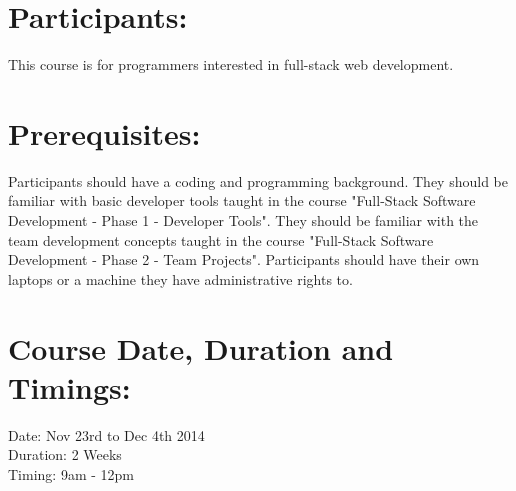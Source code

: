 \documentclass[a4paper,11pt]{article}
\begin{document}
\section{Participants:}
This course is for programmers interested in full-stack web development. 

\section{Prerequisites:}
Participants should have a coding and programming background. They should be familiar with basic developer tools taught in the course "Full-Stack Software Development - Phase 1 - Developer Tools". They should be familiar with the team development concepts taught in the course "Full-Stack Software Development - Phase 2 - Team Projects". Participants should have their own laptops or a machine they have administrative rights to.

\section{Course Date, Duration and Timings:}
Date: Nov 23rd to Dec 4th 2014\\
Duration: 2 Weeks\\
Timing: 9am - 12pm
\end{document}
